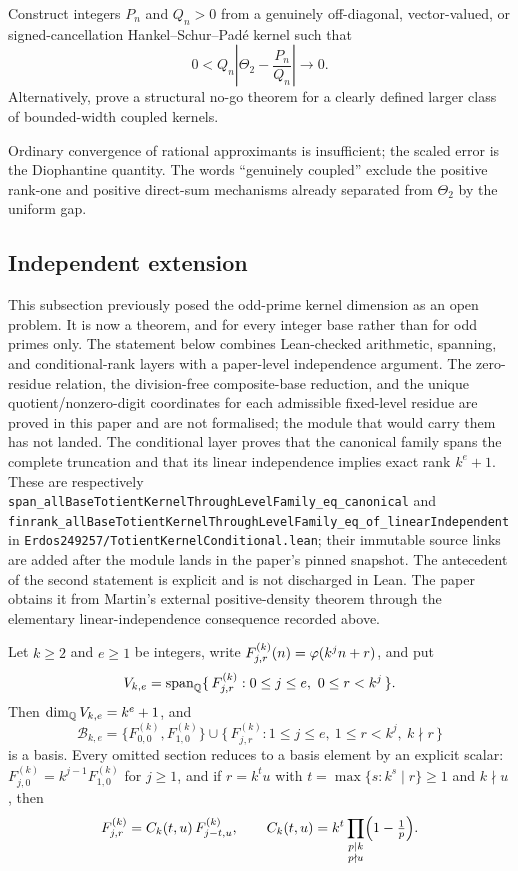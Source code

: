 \documentclass[11pt]{article}
\begin{document}
\begin{problem}\label{prob:hankel}
Construct integers $P_n$ and $Q_n>0$ from a genuinely off-diagonal,
vector-valued, or signed-cancellation Hankel--Schur--Pad\'e kernel such that
\[
 0<Q_n\left|\Theta_2-\frac{P_n}{Q_n}\right|\longrightarrow0.
\]
Alternatively, prove a structural no-go theorem for a clearly defined larger
class of bounded-width coupled kernels.
\end{problem}

\noindent Ordinary convergence of rational approximants is insufficient; the
scaled error is the Diophantine quantity.  The words ``genuinely coupled''
exclude the positive rank-one and positive direct-sum mechanisms already
separated from $\Theta_2$ by the uniform gap.

\subsection{Independent extension}

This subsection previously posed the odd-prime kernel dimension as an open
problem.  It is now a theorem, and for every integer base rather than for odd
primes only.  The statement below combines Lean-checked arithmetic, spanning,
and conditional-rank layers with a paper-level independence argument.  The
zero-residue relation, the division-free composite-base reduction, and the
unique quotient/nonzero-digit coordinates for each admissible fixed-level
residue are proved in this paper and are not formalised; the module that would
carry them has not landed.  The conditional layer proves that the canonical family spans
the complete truncation and that its linear independence implies exact rank
$k^e+1$.  These are respectively
\texttt{span\_allBaseTotientKernelThroughLevelFamily\_eq\_canonical} and
\texttt{finrank\_allBaseTotientKernelThroughLevelFamily\_eq\_of\_linearIndependent}
in \texttt{Erdos249257/TotientKernelConditional.lean}; their immutable source
links are added after the module lands in the paper's pinned snapshot.
The antecedent of the second statement is explicit and is not discharged in
Lean.  The paper obtains it from Martin's external positive-density theorem
through the elementary linear-independence consequence recorded above.

\begin{theorem}
\label{thm:kkernelrank}
Let $k\ge2$ and $e\ge1$ be integers, write $F^{(k)}_{j,r}(n)=\varphi(k^jn+r)$, and put
\[
 V_{k,e}=\operatorname{span}_{\mathbb{Q}}
 \{\,F^{(k)}_{j,r}:0\le j\le e,\ 0\le r<k^j\,\}.
\]
Then $\dim_{\mathbb{Q}}V_{k,e}=k^e+1$, and
\[
 \mathcal B_{k,e}
 =\{F^{(k)}_{0,0},F^{(k)}_{1,0}\}
 \cup\{\,F^{(k)}_{j,r}:1\le j\le e,\ 1\le r<k^j,\ k\nmid r\,\}
\]
is a basis.  Every omitted section reduces to a basis element by an explicit
scalar: $F^{(k)}_{j,0}=k^{j-1}F^{(k)}_{1,0}$ for $j\ge1$, and if $r=k^tu$ with
$t=\max\{s:k^s\mid r\}\ge1$ and $k\nmid u$, then
\[
 F^{(k)}_{j,r}=C_k(t,u)\,F^{(k)}_{j-t,u},
 \qquad
 C_k(t,u)=k^t\prod_{\substack{p\mid k\\ p\nmid u}}\Bigl(1-\tfrac1p\Bigr).
\]
\end{theorem}
\end{document}
